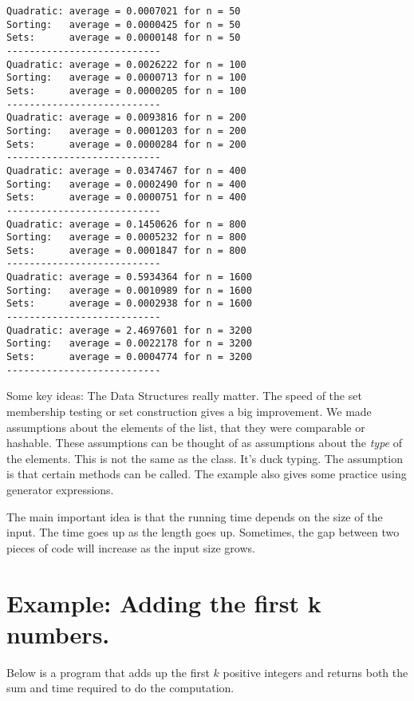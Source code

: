 \begin{Verbatim}
Quadratic: average = 0.0007021 for n = 50
Sorting:   average = 0.0000425 for n = 50
Sets:      average = 0.0000148 for n = 50
---------------------------
Quadratic: average = 0.0026222 for n = 100
Sorting:   average = 0.0000713 for n = 100
Sets:      average = 0.0000205 for n = 100
---------------------------
Quadratic: average = 0.0093816 for n = 200
Sorting:   average = 0.0001203 for n = 200
Sets:      average = 0.0000284 for n = 200
---------------------------
Quadratic: average = 0.0347467 for n = 400
Sorting:   average = 0.0002490 for n = 400
Sets:      average = 0.0000751 for n = 400
---------------------------
Quadratic: average = 0.1450626 for n = 800
Sorting:   average = 0.0005232 for n = 800
Sets:      average = 0.0001847 for n = 800
---------------------------
Quadratic: average = 0.5934364 for n = 1600
Sorting:   average = 0.0010989 for n = 1600
Sets:      average = 0.0002938 for n = 1600
---------------------------
Quadratic: average = 2.4697601 for n = 3200
Sorting:   average = 0.0022178 for n = 3200
Sets:      average = 0.0004774 for n = 3200
---------------------------
\end{Verbatim}


Some key ideas:
The Data Structures really matter.  The speed of the set membership testing or set construction gives a big improvement.
We made assumptions about the elements of the list, that they were comparable or hashable.  These assumptions can be thought of as assumptions about the \emph{type} of the elements.  This is not the same as the class.  It's duck typing.  The assumption is that certain methods can be called.
The example also gives some practice using generator expressions.


The main important idea is that the running time depends on the size of the input.  The time goes up as the length goes up.
Sometimes, the gap between two pieces of code will increase as the input size grows.

\section{Example: Adding the first k numbers.}


Below is a program that adds up the first $k$ positive integers and returns both the sum and time required to do the computation.

